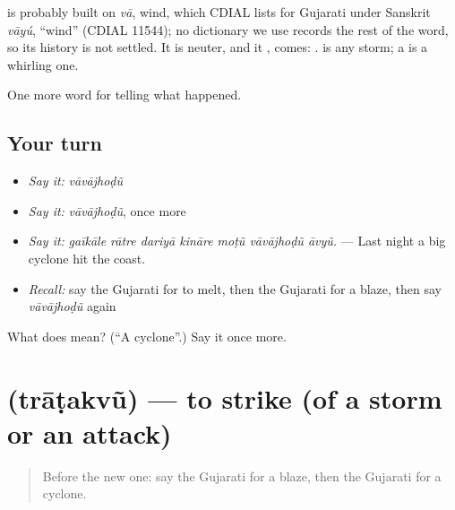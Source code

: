 \begin{cousinweb}
is probably built on \emph{vā}, wind, which CDIAL lists for Gujarati under Sanskrit \emph{vāyú}, \textquotedblleft{}wind\textquotedblright{} (CDIAL 11544); no dictionary we use records the rest of the word, so its history is not settled. It is neuter, and it \textbf{ }, comes: \textbf{ }. \textbf{} is any storm; a \textbf{} is a whirling one.
\end{cousinweb}

\begin{grammarlens}[title={What you've built}]
One more word for telling what happened.
\end{grammarlens}

\subsection*{Your turn}
\begin{itemize}
\raggedright
  \item \emph{Say it:} \emph{vāvājhoḍũ}
  \item \emph{Say it:} \emph{vāvājhoḍũ}, once more
  \item \emph{Say it:} \emph{gaīkāle rātre dariyā kināre moṭũ vāvājhoḍũ āvyũ.} — Last night a big cyclone hit the coast.
  \item \emph{Recall:} say the Gujarati for to melt, then the Gujarati for a blaze, then say \emph{vāvājhoḍũ} again
\end{itemize}

\begin{tcolorbox}[breakable,colback=teal!4,colframe=teal!35!black,title={Before you move on}]
What does  mean? (\textquotedblleft{}A cyclone\textquotedblright{}.) Say it once more.
\end{tcolorbox}
\section[\texorpdfstring{\gu{ત્રાટકવું} (trāṭakvũ)}{ત્રાટકવું (trāṭakvũ)}]{ (trāṭakvũ) — to strike (of a storm or an attack)}

\label{lesson:GU-C303-tratakvu}



\begin{quote}
Before the new one: say the Gujarati for a blaze, then the Gujarati for a cyclone.
\end{quote}

